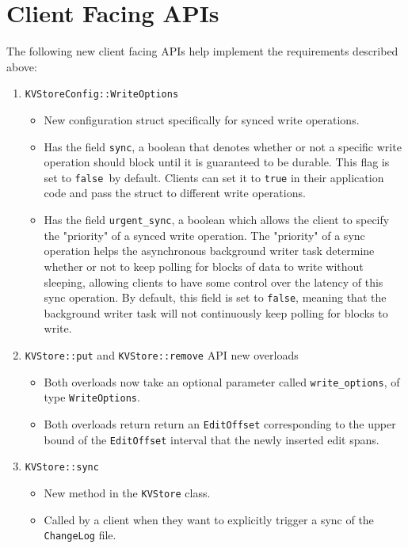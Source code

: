 \documentclass[11pt]{article}
\begin{document}
\section{Client Facing APIs}

The following new client facing APIs help implement the requirements described above:

\begin{enumerate}
    \item \texttt{KVStoreConfig::WriteOptions}
        \begin{itemize}
            \item New configuration struct specifically for synced write operations.
            \item Has the field \texttt{sync}, a boolean that denotes whether or not a specific write operation should block until it is guaranteed to be durable. This flag is set to \texttt{false }by default. Clients can set it to \texttt{true} in their application code and pass the struct to different write operations.
            \item Has the field \texttt{urgent\_sync}, a boolean which allows the client to specify the "priority" of a synced write operation. The "priority" of a sync operation helps the asynchronous background writer task determine whether or not to keep polling for blocks of data to write without sleeping, allowing clients to have some control over the latency of this sync operation. By default, this field is set to \texttt{false}, meaning that the background writer task will not continuously keep polling for blocks to write.
        \end{itemize}
    \item \texttt{KVStore::put} and \texttt{KVStore::remove} API new overloads
        \begin{itemize}
            \item Both overloads now take an optional parameter called \texttt{write\_options}, of type \texttt{WriteOptions}.
            \item Both overloads return return an \texttt{EditOffset} corresponding to the upper bound of the \texttt{EditOffset} interval that the newly inserted edit spans.
        \end{itemize}
    \item \texttt{KVStore::sync}
        \begin{itemize}
            \item New method in the \texttt{KVStore} class.
            \item Called by a client when they want to explicitly trigger a sync of the \texttt{ChangeLog} file.

\end{itemize}
\end{enumerate}
\end{document}
